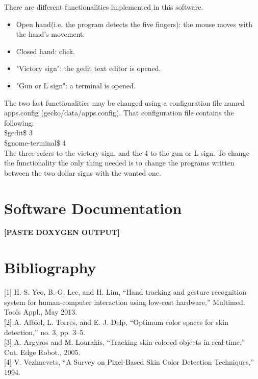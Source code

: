 \documentclass{article}
\begin{document}
There are different functionalities implemented in this software. 
\begin{itemize}
\item Open hand(i.e. the program detects the five fingers): the mouse moves with the hand's movement.
\item Closed hand: click.
\item "Victory sign": the gedit text editor is opened.
\item "Gun or L sign": a terminal is opened. 
\end{itemize}

The two last functionalities may be changed using a configuration file named apps.config (gecko/data/apps.config). 
That configuration file contains the following:
\\[0.5cm]
\$gedit\$ 3 \\
\$gnome-terminal\$ 4
\\[0.5cm]
The three refers to the victory sign, and the 4 to the gun or L sign. To change the functionality the only thing needed is to change the programs written between the two dollar signs with the wanted one. 

\newpage
\section{Software Documentation}
\textbf{[PASTE DOXYGEN OUTPUT]}

\newpage
\section{Bibliography}

[1] H.-S. Yeo, B.-G. Lee, and H. Lim, “Hand tracking and gesture recognition system for human-computer interaction using low-cost hardware,” Multimed. Tools Appl., May 2013.
\\[1cm]
[2] A. Albiol, L. Torres, and E. J. Delp, “Optimum color spaces for skin detection,” no. 3, pp. 3–5.
\\[1cm]
[3] A. Argyros and M. Lourakis, “Tracking skin-colored objects in real-time,” Cut. Edge Robot., 2005.
\\[1cm]
[4] V. Vezhnevets, “A Survey on Pixel-Based Skin Color Detection Techniques,” 1994.
\end{document}
